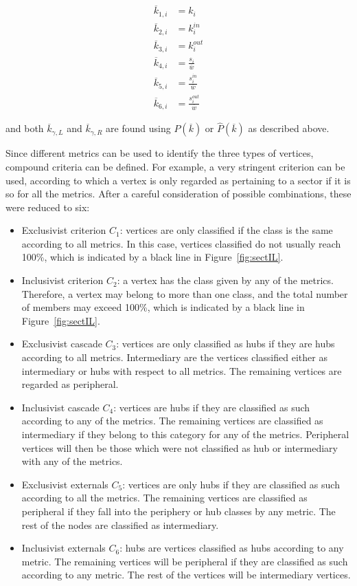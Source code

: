 \documentclass[%
	aip,
	jmp,%
	amsmath,amssymb,
	reprint,%
]{revtex4-1}
\begin{document}
\begin{equation}
	\begin{split}
		\overline{k}_{1,i}&=k_i \\
		\overline{k}_{2,i}&=k_i^{in} \\
		\overline{k}_{3,i}&=k_i^{out} \\
		\overline{k}_{4,i}&=\frac{s_i}{\overline{w}} \\
		\overline{k}_{5,i}&=\frac{s_i^{in}}{\overline{w}} \\
		\overline{k}_{6,i}&=\frac{s_i^{out}}{\overline{w}}
	\end{split}
\end{equation}

\noindent and both $\overline{k}_{\gamma,L}$ and $\overline{k}_{\gamma,R}$ are found using $P(\overline{k})$ or $\hat{P}(\overline{k})$ as described above.

Since different metrics can be used to identify the three types of vertices, compound criteria can be defined. For example, a very stringent criterion can be used, according to which a vertex is only regarded as pertaining to a sector if it is so for all the metrics. After a careful consideration of possible combinations, these were reduced to six:

\begin{itemize}
	\item Exclusivist criterion $C_1$:  vertices are only classified if the class is the same according to all metrics. In this case, vertices classified do not usually reach 100\%, which is indicated by a black line in Figure~\ref{fig:sectIL}.
	\item Inclusivist criterion $C_2$: a vertex has the class given by any of the metrics. Therefore, a vertex may belong to more than one class, and the total number of members may exceed 100\%, which is indicated by a black line in Figure~\ref{fig:sectIL}.
	\item Exclusivist cascade $C_3$: vertices are only classified as hubs if they are hubs according to all metrics. Intermediary are the vertices classified either as intermediary or hubs with respect to all metrics. The remaining vertices are regarded as peripheral.
	\item Inclusivist cascade $C_4$: vertices are hubs if they are classified as such according to any of the metrics. The remaining vertices are classified as intermediary if they belong to this category for any of the metrics. Peripheral vertices will then be those which were not classified as hub or intermediary with any of the metrics. 
	\item Exclusivist externals $C_5$: vertices are only hubs if they are classified as such according to all the metrics. The remaining vertices are classified as peripheral if they fall into the periphery or hub classes by any metric. The rest of the nodes are classified as intermediary.
	\item Inclusivist externals $C_6$: hubs are vertices classified as hubs according to any metric. The remaining vertices will be peripheral if they are classified as such according to any metric. The rest of the vertices will be intermediary vertices.
\end{itemize}
\end{document}
